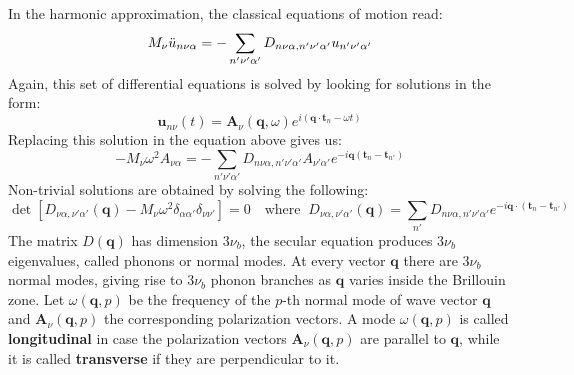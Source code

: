 \documentclass[10.75pt,a4paper,openright,bottom=2cm]{article}
\renewcommand{\Vec}[1]{\boldsymbol{#1}}
\begin{document}
\noindent
In the harmonic approximation, the classical equations of motion read:
\[
M_\nu\Ddot{u}_{n\nu\alpha}=-\sum_{n'\nu'\alpha'}D_{n\nu\alpha,n'\nu'\alpha'}u_{n'\nu'\alpha'}
\]
Again, this set of differential equations is solved by looking for solutions in the form:
\[
\Vec{u}_{n\nu}(t)=\Vec{A}_\nu(\Vec{q},\omega)e^{i(\Vec{q}\cdot\Vec{t}_n-\omega t)}
\]
Replacing this solution in the equation above gives us:
\[
-M_\nu\omega^2A_{\nu\alpha}=-\sum_{n'\nu'\alpha'}D_{n\nu\alpha,n'\nu'\alpha'}A_{\nu'\alpha'}e^{-i\Vec{q}(\Vec{t}_n-\Vec{t}_{n'})}
\]
Non-trivial solutions are obtained by solving the following:
\[
\det[D_{\nu\alpha,\nu'\alpha'}(\Vec{q})-M_\nu\omega^2\delta_{\alpha\alpha'}\delta_{\nu\nu'}]=0 \quad \text{where}\;\; D_{\nu\alpha,\nu'\alpha'}(\Vec{q})=\sum_{n'}D_{n\nu\alpha,n'\nu'\alpha'}e^{-i\Vec{q}\cdot(\Vec{t}_n-\Vec{t}_{n'})}
\]
The matrix $D(\Vec{q})$ has dimension $3\nu_b$, the secular equation produces $3\nu_b$ eigenvalues, called phonons or normal modes. At every vector $\Vec{q}$ there are $3\nu_b$ normal modes, giving rise to $3\nu_b$ phonon branches as $\Vec{q}$ varies inside the  Brillouin zone. Let $\omega(\Vec{q},p)$ be the frequency of the $p$-th normal mode of wave vector $\Vec{q}$ and $\Vec{A}_\nu(\Vec{q},p)$ the corresponding polarization vectors. A mode $\omega(\Vec{q},p)$ is called \textbf{longitudinal} in case the polarization vectors $\Vec{A}_\nu(\Vec{q},p)$ are parallel to $\Vec{q}$, while it is called \textbf{transverse} if they are perpendicular to it.
\end{document}
